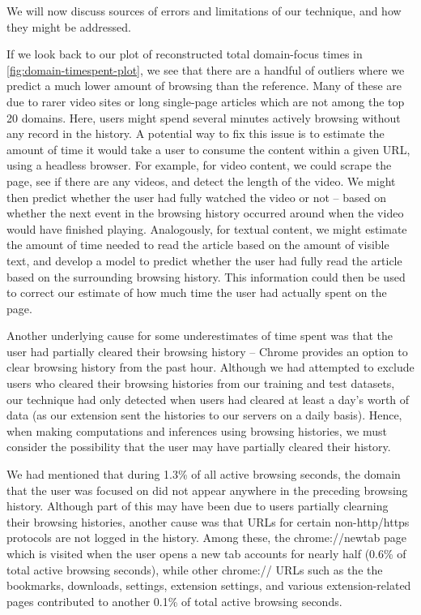 \documentclass{sigchi}
\begin{document}

We will now discuss sources of errors and limitations of our technique, and how they might be addressed.

If we look back to our plot of reconstructed total domain-focus times in \autoref{fig:domain-timespent-plot}, we see that there are a handful of outliers where we predict a much lower amount of browsing than the reference. Many of these are due to rarer video sites or long single-page articles which are not among the top 20 domains. Here, users might spend several minutes actively browsing without any record in the history. A potential way to fix this issue is to estimate the amount of time it would take a user to consume the content within a given URL, using a headless browser. For example, for video content, we could scrape the page, see if there are any videos, and detect the length of the video. We might then predict whether the user had fully watched the video or not -- based on whether the next event in the browsing history occurred around when the video would have finished playing. Analogously, for textual content, we might estimate the amount of time needed to read the article based on the amount of visible text, and develop a model to predict whether the user had fully read the article based on the surrounding browsing history. This information could then be used to correct our estimate of how much time the user had actually spent on the page.

Another underlying cause for some underestimates of time spent was that the user had partially cleared their browsing history -- Chrome provides an option to clear browsing history from the past hour. Although we had attempted to exclude users who cleared their browsing histories from our training and test datasets, our technique had only detected when users had cleared at least a day's worth of data (as our extension sent the histories to our servers on a daily basis). Hence, when making computations and inferences using browsing histories, we must consider the possibility that the user may have partially cleared their history.

We had mentioned that during 1.3\% of all active browsing seconds, the domain that the user was focused on did not appear anywhere in the preceding browsing history. Although part of this may have been due to users partially clearning their browsing histories, another cause was that URLs for certain non-http/https protocols are not logged in the history. Among these, the chrome://newtab page which is visited when the user opens a new tab accounts for nearly half (0.6\% of total active browsing seconds), while other chrome:// URLs such as the the bookmarks, downloads, settings, extension settings, and various extension-related pages contributed to another 0.1\% of total active browsing seconds.
\end{document}
